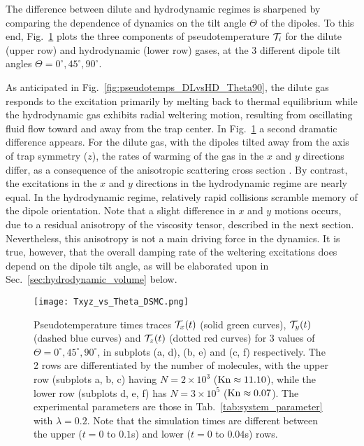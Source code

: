 \documentclass[reprint, amsmath, amssymb, aps, superscriptaddress]{revtex4-1}
\begin{document}
The difference between dilute and hydrodynamic regimes is sharpened by comparing the dependence of dynamics on the tilt angle $\Theta$ of the dipoles. To this end, Fig.~\ref{fig:Txyz_vs_Theta_(DSMC)} plots the three components of pseudotemperature ${\cal T}_{i}$ for the dilute (upper row) and hydrodynamic (lower row) gases, at the 3 different dipole tilt angles $\Theta = 0^{\circ}, 45^{\circ}, 90^{\circ}$.   


As anticipated in Fig.~\ref{fig:pseudotemps_DLvsHD_Theta90}, the dilute gas responds to the excitation primarily by melting back to thermal equilibrium while the hydrodynamic gas exhibits radial weltering motion, resulting from oscillating fluid flow toward and away from the trap center.
In Fig.~\ref{fig:Txyz_vs_Theta_(DSMC)} a second dramatic difference appears.  For the dilute gas, with the dipoles tilted away from the axis of trap symmetry ($z$), the rates of warming of the gas in the $x$ and $y$ directions differ, as a consequence of the anisotropic scattering cross section \cite{Bohn14_PRA, Sykes15_PRA, Wang21_PRA}.  By contrast, the   excitations in the $x$ and $y$ directions in the hydrodynamic regime are nearly equal.   In the hydrodynamic regime, relatively rapid collisions scramble memory of the dipole orientation.  Note that a slight difference in $x$ and $y$ motions occurs, due to a residual anisotropy of the viscosity tensor, described in the next section.  Nevertheless, this anisotropy is not a main driving force in the dynamics. It is true, however, that the overall damping rate of the weltering excitations does depend on the dipole tilt angle, as will be elaborated upon in Sec.~\ref{sec:hydrodynamic_volume} below.

\onecolumngrid

\begin{figure}[ht]
    \centering
    \texttt{[image: Txyz\_vs\_Theta\_DSMC.png]}
    \caption{ Pseudotemperature times traces ${\cal T}_x(t)$ (solid green curves), ${\cal T}_y(t)$ (dashed blue curves) and ${\cal T}_z(t)$ (dotted red curves) for 3 values of $\Theta = 0^{\circ}, 45^{\circ}, 90^{\circ}$, in subplots (a, d), (b, e) and (c, f) respectively.
    The 2 rows are differentiated by the number of molecules, with the upper row (subplots a, b, c) having $N = 2 \times 10^3$ (${\rm Kn} \approx 11.10$), while the lower row (subplots d, e, f) has $N = 3 \times 10^5$ (${\rm Kn} \approx 0.07$).
    The experimental parameters are those in Tab.~\ref{tab:system_parameter} with $\lambda = 0.2$.
    Note that the simulation times are different between the upper ($t = 0$ to $0.1$s) and lower ($t = 0$ to $0.04$s) rows. }
    \label{fig:Txyz_vs_Theta_(DSMC)}
\end{figure}
\end{document}
